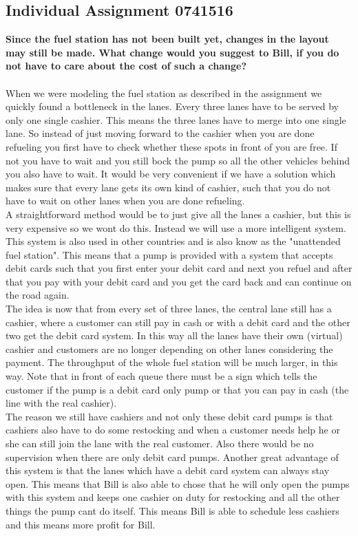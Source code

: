 \subsection{Individual Assignment 0741516}\label{app:indivjasper}
\textbf{Since the fuel station has not been built yet, changes in the layout may still be made. What change would you suggest to Bill, if you do not have to care about the cost of such a change?}\\
\\
When we were modeling the fuel station as described in the assignment we quickly found a bottleneck in the lanes. Every three lanes have to be served by only one single cashier. This means the three lanes have to merge into one single lane. So instead of just moving forward to the cashier when you are done refueling you first have to check whether these spots in front of you are free. If not you have to wait and you still bock the pump so all the other vehicles behind you also have to wait. It would be very convenient if we have a solution which makes sure that every lane gets its own kind of cashier, such that you do not have to wait on other lanes when you are done refueling.\\
A straightforward method would be to just give all the lanes a cashier, but this is very expensive so we wont do this. Instead we will use a more intelligent system. This system is also used in other countries and is also know as the "unattended fuel station". This means that a pump is provided with a system that accepts debit cards such that you first enter your debit card and next you refuel and after that you pay with your debit card and you get the card back and can continue on the road again. \\
The idea is now that from every set of three lanes, the central lane still has a cashier, where a customer can still pay in cash or with a debit card and the other two get the debit card system. In this way all the lanes have their own (virtual) cashier and customers are no longer depending on other lanes considering the payment. The throughput of the whole fuel station will be much larger, in this way. Note that in front of each queue there must be a sign which tells the customer if the pump is a debit card only pump or that you can pay in cash (the line with the real cashier).\\
The reason we still have cashiers and not only these debit card pumps is that cashiers also have to do some restocking and when a customer needs help he or she can still join the lane with the real customer. Also there would be no supervision when there are only debit card pumps. Another great advantage of this system is that the lanes which have a debit card system can always stay open. This means that Bill is also able to chose that he will only open the pumps with this system and keeps one cashier on duty for restocking and all the other things the pump cant do itself. This means Bill is able to schedule less cashiers and this means more profit for Bill.
\newpage
